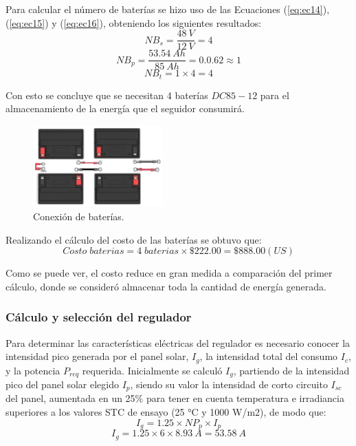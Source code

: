 Para calcular el número de baterías se hizo uso de las Ecuaciones (\ref{eq:ec14}), (\ref{eq:ec15}) y (\ref{eq:ec16}), obteniendo los siguientes resultados:
\begin{equation}\label{eq:ec22}
NB_{s} = \frac{48 \ V}{12 \ V}=4
\end{equation}
\begin{equation}\label{eq:ec23}
NB_{p} = \frac{53.54 \ Ah}{85 \ Ah}=0.0.62 \approx 1
\end{equation}
\begin{equation}\label{eq:ec24}
NB_{t} = 1 \times 4 = 4
\end{equation}

Con esto se concluye que se necesitan 4 baterías $ DC85-12 $ para el almacenamiento de la energía que el seguidor consumirá.
\begin{figure}[H]
	\centering
	\includegraphics[width=5cm]{imagenes/Confbat1.eps}
	\caption{Conexión de baterías.}
	\label{fig:Confbat}
\end{figure}

Realizando el cálculo del costo de las baterías se obtuvo que:
\begin{equation}\label{eq:ec25}
Costo\; baterias = 4\; baterias \times \$222.00 =\$888.00 (US)
\end{equation}

Como se puede ver, el costo reduce en gran medida a comparación del primer cálculo, donde se consideró almacenar toda la cantidad de energía generada.

\subsubsection{Cálculo y selección del regulador}

Para determinar las características eléctricas del regulador es necesario conocer la intensidad pico generada por el panel solar, \textit{$I_g$}, la intensidad total del consumo \textit{$I_c$}, y la potencia \textit{$P_{req}$} requerida. Inicialmente se calculó \textit{$I_g$}, partiendo de la intensidad pico del panel solar elegido \textit{$I_p$}, siendo su valor la intensidad de corto circuito \textit{$I_{sc}$} del panel, aumentada en un 25\% \cite{DDE6} para tener en cuenta temperatura e irradiancia superiores a los valores STC de ensayo (25 °C y 1000 W/m2), de modo que: 
\begin{equation}\label{eq:ec26}
I_{g} = 1.25 \times NP_{p} \times I_{p}
\end{equation}
\begin{equation}\label{eq:ec27}
I_{g} = 1.25 \times 6 \times 8.93 \ A=53.58 \ A
\end{equation}


